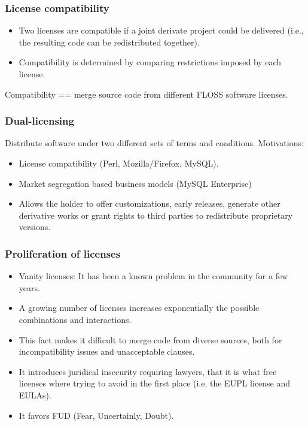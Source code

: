 
\begin{frame}
\frametitle{License compatibility}

\begin{itemize}
\item Two licenses are compatible if a joint derivate project could be delivered (i.e., the resulting code can be redistributed together).
\item Compatibility is determined by comparing restrictions imposed by each license.
\end{itemize}

Compatibility == merge source code from different FLOSS software licenses.

\end{frame}


\begin{frame}
\frametitle{Dual-licensing}

Distribute software under two different sets of terms and conditions. Motivations:

\begin{itemize}
\item License compatibility (Perl, Mozilla/Firefox, MySQL).
\item Market segregation based business models (MySQL Enterprise)
\item Allows the holder to offer customizations, early releases, generate other derivative works or grant rights to third parties to redistribute proprietary versions.
\end{itemize}

                                                 
\end{frame}


\begin{frame}
\frametitle{Proliferation of licenses}

\begin{itemize}
\item Vanity licenses: It has been a known problem in the community for a few years.
\item A growing number of licenses increases exponentially the possible combinations and interactions. 
\item This fact makes it difficult to merge code from diverse sources, both for incompatibility issues and unacceptable clauses.
\item It introduces juridical insecurity requiring lawyers, that it is what free licenses where trying to avoid in the first place (i.e. the EUPL license and EULAs).
\item It favors FUD (Fear, Uncertainly, Doubt).
\end{itemize}                                                 

\end{frame}



